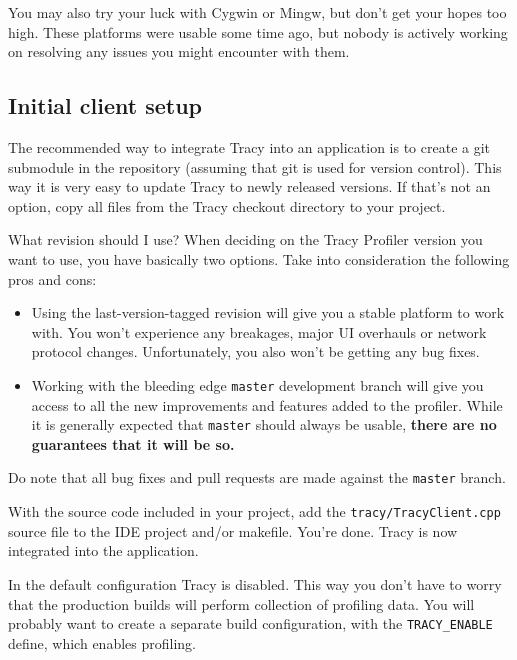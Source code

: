 \documentclass[hidelinks,titlepage,a4paper]{article}
\begin{document}
You may also try your luck with Cygwin or Mingw, but don't get your hopes too high. These platforms were usable some time ago, but nobody is actively working on resolving any issues you might encounter with them.

\subsection{Initial client setup}
\label{initialsetup}

The recommended way to integrate Tracy into an application is to create a git submodule in the repository (assuming that git is used for version control). This way it is very easy to update Tracy to newly released versions. If that's not an option, copy all files from the Tracy checkout directory to your project.

\begin{bclogo}[
noborder=true,
couleur=black!5,
logo=\bclampe
]{What revision should I use?}
When deciding on the Tracy Profiler version you want to use, you have basically two options. Take into consideration the following pros and cons:

\begin{itemize}
\item Using the last-version-tagged revision will give you a stable platform to work with. You won't experience any breakages, major UI overhauls or network protocol changes. Unfortunately, you also won't be getting any bug fixes.
\item Working with the bleeding edge \texttt{master} development branch will give you access to all the new improvements and features added to the profiler. While it is generally expected that \texttt{master} should always be usable, \textbf{there are no guarantees that it will be so.}
\end{itemize}

Do note that all bug fixes and pull requests are made against the \texttt{master} branch.
\end{bclogo}

With the source code included in your project, add the \texttt{tracy/TracyClient.cpp} source file to the IDE project and/or makefile. You're done. Tracy is now integrated into the application.

In the default configuration Tracy is disabled. This way you don't have to worry that the production builds will perform collection of profiling data. You will probably want to create a separate build configuration, with the \texttt{TRACY\_ENABLE} define, which enables profiling.
\end{document}
